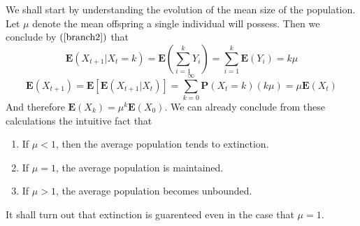 We shall start by understanding the evolution of the mean size of the population. Let $\mu$ denote the mean offspring a single individual will possess. Then we conclude by $(\ref{branch2})$ that
%
\begin{equation} \label{branchcondexp} \mathbf{E}(X_{t+1} | X_t = k) = \mathbf{E}\left(\sum_{i = 1}^k Y_i\right) = \sum_{i = 1}^k \mathbf{E}(Y_i) = k \mu \end{equation}
%
\begin{equation} \mathbf{E}(X_{t+1}) = \mathbf{E}[\mathbf{E}(X_{t+1} | X_t)] = \sum_{k = 0}^\infty \mathbf{P}(X_t = k) (k \mu) = \mu \mathbf{E}(X_t) \end{equation}
%
And therefore $\mathbf{E}(X_k) = \mu^k \mathbf{E}(X_0)$. We can already conclude from these calculations the intuitive fact that
%
\begin{enumerate}
    \item If $\mu < 1$, then the average population tends to extinction.
    \item If $\mu = 1$, the average population is maintained.
    \item If $\mu > 1$, the average population becomes unbounded.
\end{enumerate}
%
It shall turn out that extinction is guarenteed even in the case that $\mu = 1$.

